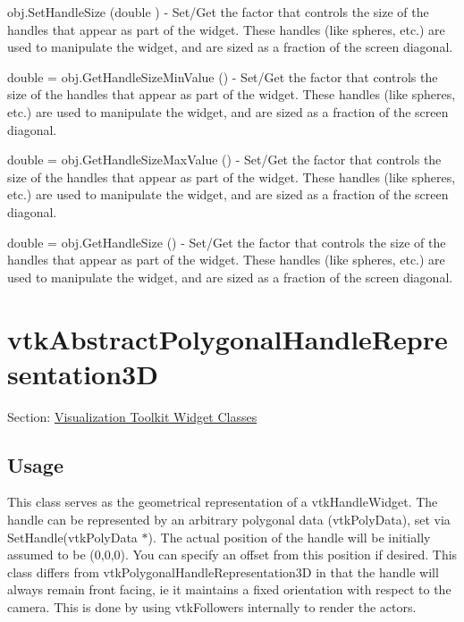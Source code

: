 \begin{DoxyItemize}
\item {\ttfamily obj.\-Set\-Handle\-Size (double )} -\/ Set/\-Get the factor that controls the size of the handles that appear as part of the widget. These handles (like spheres, etc.) are used to manipulate the widget, and are sized as a fraction of the screen diagonal.  
\item {\ttfamily double = obj.\-Get\-Handle\-Size\-Min\-Value ()} -\/ Set/\-Get the factor that controls the size of the handles that appear as part of the widget. These handles (like spheres, etc.) are used to manipulate the widget, and are sized as a fraction of the screen diagonal.  
\item {\ttfamily double = obj.\-Get\-Handle\-Size\-Max\-Value ()} -\/ Set/\-Get the factor that controls the size of the handles that appear as part of the widget. These handles (like spheres, etc.) are used to manipulate the widget, and are sized as a fraction of the screen diagonal.  
\item {\ttfamily double = obj.\-Get\-Handle\-Size ()} -\/ Set/\-Get the factor that controls the size of the handles that appear as part of the widget. These handles (like spheres, etc.) are used to manipulate the widget, and are sized as a fraction of the screen diagonal.  
\end{DoxyItemize}\hypertarget{vtkwidgets_vtkabstractpolygonalhandlerepresentation3d}{}\section{vtk\-Abstract\-Polygonal\-Handle\-Representation3\-D}\label{vtkwidgets_vtkabstractpolygonalhandlerepresentation3d}
Section\-: \hyperlink{sec_vtkwidgets}{Visualization Toolkit Widget Classes} \hypertarget{vtkwidgets_vtkxyplotwidget_Usage}{}\subsection{Usage}\label{vtkwidgets_vtkxyplotwidget_Usage}
This class serves as the geometrical representation of a vtk\-Handle\-Widget. The handle can be represented by an arbitrary polygonal data (vtk\-Poly\-Data), set via Set\-Handle(vtk\-Poly\-Data $\ast$). The actual position of the handle will be initially assumed to be (0,0,0). You can specify an offset from this position if desired. This class differs from vtk\-Polygonal\-Handle\-Representation3\-D in that the handle will always remain front facing, ie it maintains a fixed orientation with respect to the camera. This is done by using vtk\-Followers internally to render the actors.

